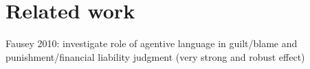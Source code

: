 \documentclass[11pt,a4paper]{article}
\newcommand{\ek}[1]{\textcolor{Orange}{[ek: #1]}}
\begin{document}




\section{Related work}

Fausey 2010: investigate role of agentive language in guilt/blame and punishment/financial liability judgment (very strong and robust effect)
\end{document}
